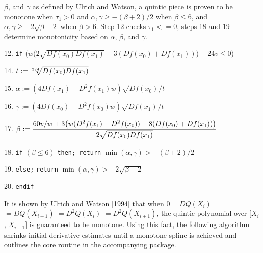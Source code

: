 {{  $\beta$, and $\gamma$ as defined by Ulrich and Watson, a quintic
  piece is proven to be monotone when $\tau_1 > 0$ and $\alpha, \gamma
  \geq -(\beta+2)/2$ when $\beta \leq 6$, and $\alpha, \gamma \geq -2
  \sqrt{\beta-2}$ when $\beta > 6$. Step 12 checks $\tau_1 <= 0$,
  steps 18 and 19 determine monotonicity based on $\alpha$, $\beta$,
  and $\gamma$.} \vskip 1mm
\item{12.} {\tt if} $\big( w\big(2\sqrt{Df(x_0) Df(x_1)} - 3(Df(x_0) +
  Df(x_1))\big) - 24v \leq 0 \big)$
\item{} 
\item{14.} $t := \root{3/4}\of{Df(x_0) Df(x_1)}$
\item{15.} $\alpha := (4 Df(x_1) - D^2f(x_1)w) \sqrt{Df(x_0)} / t$
\item{16.} $\gamma := (4 Df(x_0) - D^2f(x_0)w) \sqrt{Df(x_1)} / t$
\item{17.} $\displaystyle \beta := {60v/w + 3\big(w(D^2f(x_1) -
  D^2f(x_0)) - 8(Df(x_0) + Df(x_1))\big) \over 2 \sqrt{Df(x_0) Df(x_1)}}$
\item{18.} {\tt if} $(\beta \leq 6)$ {\tt then; return} $\min(\alpha,\gamma) > - (\beta + 2) / 2$
\item{19.} {\tt else;} \hskip 18mm {\tt return} $\min(\alpha,\gamma) > -2 \sqrt{\beta - 2}$
\item{20.} {\tt endif}
}
\vskip 5mm

It is shown by Ulrich and Watson [1994] that when $0 = DQ(X_i)$ $=
DQ(X_{i+1})$ $= D^2Q(X_i)$ $= D^2Q(X_{i+1})$, the quintic polynomial
over $[X_i$, $X_{i+1}]$ is guaranteed to be monotone. Using this fact,
the following algorithm shrinks initial derivative estimates until a
monotone spline is achieved and outlines the core routine in the
accompanying package.

